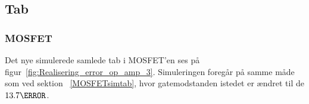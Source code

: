 \subsection{Tab}

\subsubsection{MOSFET}
Det nye simulerede samlede tab i MOSFET'en ses på figur~\ref{fig:Realisering_error_op_amp_3}. Simuleringen foregår på samme måde som ved sektion ~\ref{MOSFETsimtab}, hvor gatemodstanden istedet er ændret til de $13.7\ohm$. 